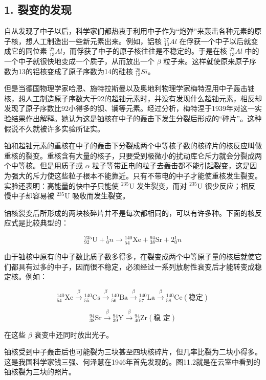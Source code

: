 \subsection{1. 裂变的发现}

自从发现了中子以后，科学家们都热衷于利用中子作为``炮弹''来轰击各种元素的原子核，想人工制造出一些新元素出来。例如，铝核
\(^{27}_{13}Al\) 在俘获一个中子以后就变成它的同位素
\(^{27}_{13}Al\)，而俘获了中子的原子核往往是不稳定的。于是在核
\(^{27}_{13}Al\) 中的一个中子就很快地变成一个质子，从而放出一个
\(\beta\) 粒子来。这样就使原来原子序数为13的铝核变成了原子序数为14的硅核
\(^{28}_{13}Si\)。

但是当德国物理学家哈恩、施特拉斯曼以及奥地利物理学家梅特涅用中子轰击铀核，想人工制造原子序数大于92的超铀元素时，并没有发现什么超铀元素，相反却发现了原子序数比92小得多的钡、镧等元素。经过分析，梅特涅于1939年对这一实验结果作出解释。她认为这是铀核在中子的轰击下发生分裂后形成的``碎片''。这种假说不久就被许多实验所证实。

铀和超铀元素的重核在中子的轰击下分裂成两个中等核子数的核碎片的核反应叫做重核的裂变。重核含有大量的核子，只要受到极微小的扰动库仑斥力就会分裂成两个中等核。但是用质子或
\(\alpha\)
粒子等带正电的粒子去轰击都不能引起裂变，这是因为强大的斥力使这些粒子根本不能靠近。只有不带电的中子才能使重核发生裂变。实验还表明：高能量的快中子只能使
\(^{235}\mathrm{U}\) 发生裂变，而对 \(^{235}\mathrm{U}\)
很少反应；相反慢中子却容易被 \(^{235}\mathrm{U}\) 吸收而发生裂变。

铀核裂变后所形成的两块核碎片并不是每次都相同的，可以有许多种。下面的核反应式是比较典型的：

\[
{ } _ {92}^{235}\mathrm{U}+{ } _ {0}^{1}n\longrightarrow { } _ {54}^{140}\mathrm{Xe}+{ } _ {38}^{94}\mathrm{Sr}+2{ } _ {0}^{1}n
\]

由于铀核中原有的中子数比质子数多得多，在裂变成两个中等原子量的核后就使它们都具有过多的中子，因而很不稳定，必须经过一系列放射性衰变后才能转变成稳定核。例如：

\[
{ } _ {54}^{140}\mathrm{Xe}\xrightarrow{\beta}{ } _ {55}^{140}\mathrm{Cs}\xrightarrow{\beta}{ } _ {56}^{140}\mathrm{Ba}\xrightarrow{\beta}{ } _ {57}^{140}\mathrm{La}\xrightarrow{\beta}{ } _ {58}^{140}\mathrm{Ce} (\text{稳定})
\]

\[
{ } _ {38}^{94}\mathrm{Sr}\xrightarrow{\beta}{ } _ {39}^{94}\mathrm{Y}\xrightarrow{\beta}{ } _ {40}^{94}\mathrm{Zr} (\text{稳 定})
\]

在这些 \(\beta\) 衰变中还同时放出光子。

铀核受到中子轰击后也可能裂为三块甚至四块核碎片，但几率比裂为二块小得多。这是我国科学家钱三强、何泽慧在1946年首先发现的。图11.2就是在云室中看到的铀核裂为三块的照片。

